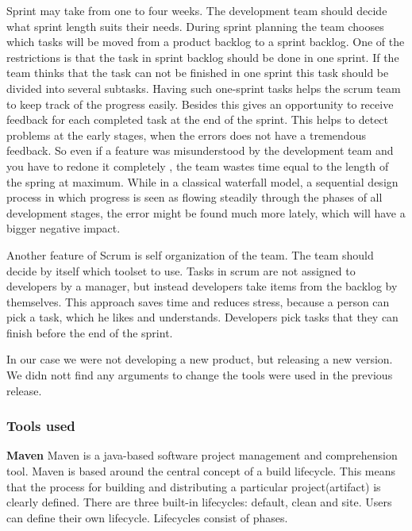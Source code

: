   Sprint may take from one to four weeks. The development team should decide
  what sprint length suits their needs. During sprint planning the team chooses
  which tasks will be moved from a product backlog to a sprint backlog.
  One of the restrictions is that the task in sprint backlog should be done in one sprint.
  If the team thinks that the task can not be finished in one sprint this task
  should be divided into several subtasks. 
  Having such one-sprint tasks helps the scrum team to keep track of the
  progress easily. Besides this gives an opportunity to receive feedback for each completed task at the end
  of the sprint. This helps to detect problems at the early stages, when
  the errors does not have a tremendous feedback. So even if a feature was misunderstood by the development team
  and you have to redone it completely , the team wastes time equal to the
  length of the spring at maximum. While in a classical waterfall model, a sequential design process in which
  progress is seen as flowing steadily through the phases of all development stages, 
  the error might be found much more lately, which will have a bigger negative impact.

  Another feature of Scrum is self organization of the team. The team should
  decide by itself which toolset to use. Tasks in scrum are not assigned to developers by a manager,
  but instead developers take items from the backlog by themselves.
  This approach saves time and reduces stress, because a person can pick a task,
  which he likes and understands. Developers pick tasks that they
  can finish before the end of the sprint.

  In our case we were not developing a new product, but releasing a new version.
  We didn nott find any arguments to change the tools were used in the previous
  release.

  \subsubsection {Tools used}
  
  \textbf{Maven}
  Maven is a java-based software project management and comprehension tool.
  Maven is based around the central concept of a build lifecycle. This means that the process for building 
  and distributing a particular project(artifact) is clearly defined. There are three built-in lifecycles:
  default, clean and site. Users can define their own lifecycle. Lifecycles consist of phases.
   
